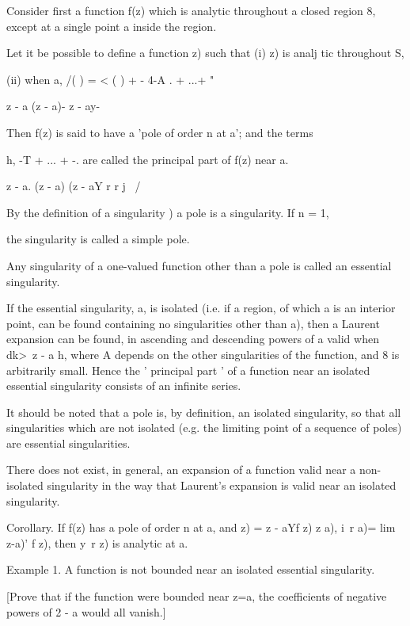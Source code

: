 {{{{

Consider first a function f(z) which is analytic throughout a closed
region 8, except at a single point a inside the region.

Let it be possible to define a function z) such that (i) z) is analj
tic throughout S,

(ii) when a, /( ) = < ( ) + - 4-A . + ...+ "

z - a (z - a)- z - ay-

Then f(z) is said to have a 'pole of order n at a'; and the terms

h, -T + ... + -. are called the principal part of f(z) near a.

z - a. (z - a) (z - aY r r j \ /

By the definition of a singularity ) a pole is a singularity.
If n = 1,

the singularity is called a simple pole.

Any singularity of a one-valued function other than a pole is called
an essential singularity.

If the essential singularity, a, is isolated (i.e. if a region, of
which a is an interior point, can be found containing no singularities
other than a), then a Laurent expansion can be found, in ascending and
descending powers of a valid when dk>\ z - a h, where A depends on the
other singularities of the function, and 8 is arbitrarily small. Hence
the ' principal part ' of a function near an isolated essential
singularity consists of an infinite series.

It should be noted that a pole is, by definition, an isolated
singularity, so that all singularities which are not isolated (e.g.
the limiting point of a sequence of poles) are essential
singularities.

There does not exist, in general, an expansion of a function valid
near a non-isolated singularity in the way that Laurent's expansion is
valid near an isolated singularity.

Corollary. If f(z) has a pole of order n at a, and z) = z - aYf z) z
a), i\ r a)= lim z-a)' f z), then y\ r z) is analytic at a.

Example 1. A function is not bounded near an isolated essential
singularity.

[Prove that if the function were bounded near z=a, the coefficients of
negative powers of 2 - a would all vanish.]

}}}}
